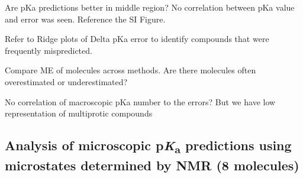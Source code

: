 \documentclass[9pt,lineno,final]{elife}
\newcommand{\pKa}{p\textit{K}\textsubscript{a}}
\begin{document}
Are pKa predictions better in middle region?
No correlation between pKa value and error was seen.
Reference the SI Figure.

Refer to Ridge plots of Delta pKa error to identify compounds that were frequently mispredicted.

Compare ME of molecules across methods.
Are there molecules often overestimated or underestimated?

No correlation of macroscopic pKa number to the errors? But we have low representation of multiprotic compounds








\subsection{Analysis of microscopic \pKa{} predictions using microstates determined by NMR (8 molecules)}
\end{document}
